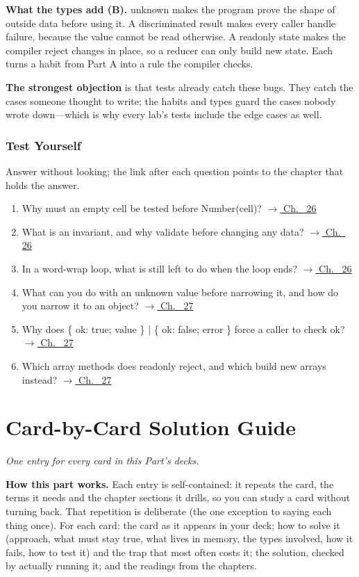 \documentclass[10pt]{article}
\newcommand{\code}[1]{{\ttfamily\small #1}}
\newcommand{\partq}[2]{\part*{#1}{\small\itshape #2}}
\newcommand{\partline}[2]{\phantomsection\partq{#1}{#2}}  %
\begin{document}
\textbf{What the types add (B).} \code{unknown} makes the program prove the shape of outside data before using it. A discriminated result makes every caller handle failure, because the value cannot be read otherwise. A \code{readonly} state makes the compiler reject changes in place, so a reducer can only build new state. Each turns a habit from Part A into a rule the compiler checks.

\textbf{The strongest objection} is that tests already catch these bugs. They catch the cases someone thought to write; the habits and types guard the cases nobody wrote down---which is why every lab's tests include the edge cases as well.

\section*{Test Yourself}
Answer without looking; the link after each question points to the chapter that holds the answer.
\begin{enumerate}[leftmargin=1.6em,itemsep=3pt]
\item Why must an empty cell be tested before \code{Number(cell)}? \hfill{\small\hyperref[ch:c26]{$\rightarrow$ Ch.~ 26}}
\item What is an invariant, and why validate before changing any data? \hfill{\small\hyperref[ch:c26]{$\rightarrow$ Ch.~ 26}}
\item In a word-wrap loop, what is still left to do when the loop ends? \hfill{\small\hyperref[ch:c26]{$\rightarrow$ Ch.~ 26}}
\item What can you do with an \code{unknown} value before narrowing it, and how do you narrow it to an object? \hfill{\small\hyperref[ch:c27]{$\rightarrow$ Ch.~ 27}}
\item Why does \code{\{ ok: true; value \} | \{ ok: false; error \}} force a caller to check \code{ok}? \hfill{\small\hyperref[ch:c27]{$\rightarrow$ Ch.~ 27}}
\item Which array methods does \code{readonly} reject, and which build new arrays instead? \hfill{\small\hyperref[ch:c27]{$\rightarrow$ Ch.~ 27}}
\end{enumerate}
\newpage{}\partline{Card-by-Card Solution Guide}{One entry for every card in this Part's decks.}
\begin{corebox}\textbf{How this part works.} Each entry is self-contained: it repeats the card, the terms it needs and the chapter sections it drills, so you can study a card without turning back. That repetition is deliberate (the one exception to saying each thing once). For each card: the card as it appears in your deck; how to solve it (approach, what must stay true, what lives in memory, the types involved, how it fails, how to test it) and the trap that most often costs it; the solution, checked by actually running it; and the readings from the chapters.\end{corebox}
\end{document}
